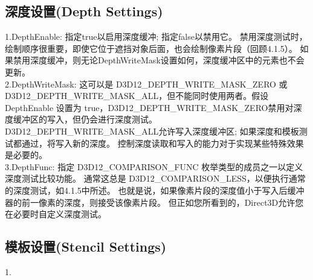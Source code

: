 \subsection{深度设置(Depth Settings)}
\begin{flushleft}
1.DepthEnable: 指定true以启用深度缓冲; 指定false以禁用它。 禁用深度测试时，绘制顺序很重要，即使它位于遮挡对象后面，也会绘制像素片段（回顾4.1.5）。 如果禁用深度缓冲，则无论DepthWriteMask设置如何，深度缓冲区中的元素也不会更新。\\

2.DepthWriteMask: 这可以是 D3D12\_DEPTH\_WRITE\_MASK\_ZERO 或 D3D12\_DEPTH\_WRITE\_MASK\_ALL，但不能同时使用两者。假设 DepthEnable 设置为 true，D3D12\_DEPTH\_WRITE\_MASK\_ZERO禁用对深度缓冲区的写入，但仍会进行深度测试。D3D12\_DEPTH\_WRITE\_MASK\_ALL允许写入深度缓冲区; 如果深度和模板测试都通过，将写入新的深度。 控制深度读取和写入的能力对于实现某些特殊效果是必要的。\\

3.DepthFunc: 指定 D3D12\_COMPARISON\_FUNC 枚举类型的成员之一以定义深度测试比较功能。 通常这总是 D3D12\_COMPARISON\_LESS，以便执行通常的深度测试，如4.1.5中所述。 也就是说，如果像素片段的深度值小于写入后缓冲器的前一像素的深度，则接受该像素片段。 但正如您所看到的，Direct3D允许您在必要时自定义深度测试。\\
\end{flushleft}

\subsection{模板设置(Stencil Settings)}
\begin{flushleft}
1.
\end{flushleft}




